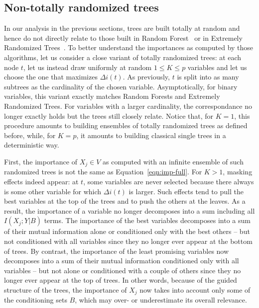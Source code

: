 \subsection{Non-totally randomized trees}
\label{sec:ntrt}

In our analysis in the previous sections, trees are built totally at random and
hence do not directly relate to those built in Random
Forest~\citep{breiman:2001} or in Extremely Randomized
Trees~\citep{geurts:2006}. To better understand the importances as computed by
those algorithms,  let us consider a close variant of totally randomized trees:
at each node $t$, let us instead draw uniformly at random $1 \leq K \leq p$
variables  and let us choose the one that maximizes $\Delta i(t)$. As
previously, $t$ is split into as many subtrees as the cardinality of the chosen
variable. Asymptotically, for binary variables, this variant exactly matches
Random Forests and Extremely Randomized Trees. For variables with a larger
cardinality, the correspondance no longer exactly holds but the trees still
closely relate. Notice that, for $K=1$, this procedure amounts to building
ensembles of  totally randomized trees as defined before, while, for $K=p$, it
amounts to building classical single trees in a deterministic way.

First, the importance of  $X_j \in V$ as computed with an infinite ensemble of
such randomized trees is not the same as Equation~\ref{eqn:imp-full}. For $K>1$,
masking effects indeed appear: at $t$, some variables are never selected
because there always is some other variable for which $\Delta i(t)$ is larger.
Such effects tend to pull the best variables  at the top of the trees and to
push the others at the leaves.  As a result, the importance of a variable no
longer decomposes into a sum including all $I(X_j;Y|B)$ terms. The
importance of the best variables decomposes into a sum of their mutual
information alone or conditioned only with the best others -- but not
conditioned with all variables since they no longer ever appear at the bottom of
trees. By contrast, the importance of the least promising variables now
decomposes into a sum of their mutual information conditioned only with all
variables -- but not alone or conditioned with a couple of others since they no
longer ever appear at the top of trees. In other words, because of the guided
structure of the trees, the importance of $X_j$ now takes into account only some
of the conditioning sets $B$, which may over- or underestimate its overall
relevance.

